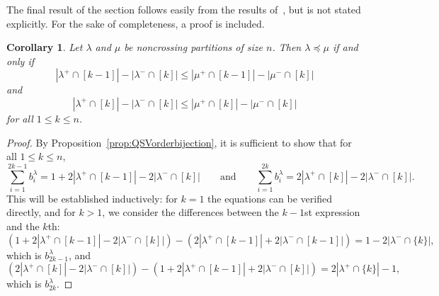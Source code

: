 \documentclass[12pt]{amsart}
\newtheorem{cor}[equation]{Corollary}
\theoremstyle{definition}
\theoremstyle{remark}
\numberwithin{equation}{section}
\begin{document}
The final result of the section follows easily from the results of~\cite{GobetWilliams}, but is not stated explicitly.  For the sake of completeness, a proof is included.

\begin{cor}
\label{cor:bruhatncphelper}
Let $\lambda$ and $\mu$ be noncrossing partitions of size $n$.  Then $\lambda \preceq \mu$ if and only if 
\[
|\lambda^{+} \cap [k-1]| - |\lambda^{-} \cap [k]| \le |\mu^{+} \cap [k-1]| - |\mu^{-} \cap [k]|
\]
and
\[
|\lambda^{+} \cap [k]| - |\lambda^{-} \cap [k]| \le |\mu^{+} \cap [k]| - |\mu^{-} \cap [k]| 
\]
for all $1 \le k \le n$.
\end{cor}
\begin{proof}
By Proposition~\ref{prop:QSVorderbijection}, it is sufficient to show that for all $1 \le k \le n$,
\[
\sum_{i = 1}^{2k - 1} b^{\lambda}_{i}  = 1 + 2|\lambda^{+} \cap [k-1]| - 2|\lambda^{-} \cap [k]|
\qquad\text{and}\qquad
\sum_{i = 1}^{2k} b^{\lambda}_{i}  = 2|\lambda^{+} \cap [k]| - 2|\lambda^{-} \cap [k]|.
\] 
This will be established inductively: for $k = 1$ the equations can be verified directly, and for $k > 1$, we consider the differences between the $k-1$st expression and the $k$th: 
\[
(1 + 2|\lambda^{+} \cap [k-1]| - 2|\lambda^{-} \cap [k]|) - (2|\lambda^{+} \cap [k-1]| + 2|\lambda^{-} \cap [k-1]|)
= 1 - 2|\lambda^{-} \cap \{k\}|,
\]
which is $b^{\lambda}_{2k-1}$, and 
\[
(2|\lambda^{+} \cap [k]| - 2|\lambda^{-} \cap [k]|) - (1 + 2|\lambda^{+} \cap [k-1]| + 2|\lambda^{-} \cap [k]|) = 2|\lambda^{+} \cap \{k\}| - 1,
\]
which is $b^{\lambda}_{2k}$.
\end{proof}
\end{document}
